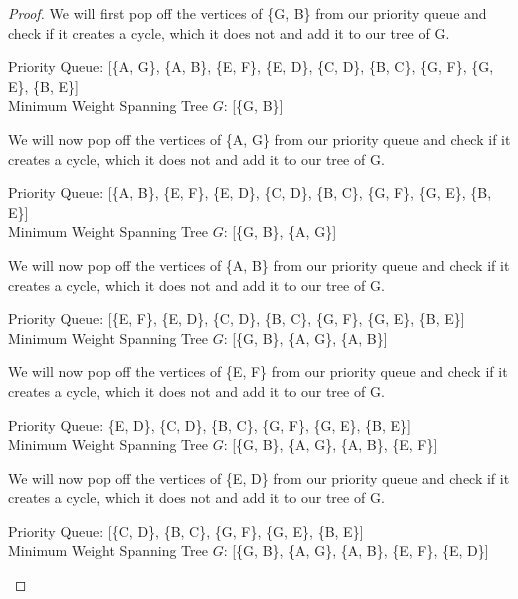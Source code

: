 \documentclass[11pt]{article}
\theoremstyle{definition}
\theoremstyle{definition}
\theoremstyle{definition}
\begin{document}
\begin{proof}
We will first pop off the vertices of \{G, B\} from our priority queue and check if it creates a cycle, which it does not and add it to our tree of G. \\
\begin{center}
Priority Queue: [\{A, G\}, \{A, B\}, \{E, F\}, \{E, D\}, \{C, D\}, \{B, C\}, \{G, F\}, \{G, E\}, \{B, E\}]\\
Minimum Weight Spanning Tree $G$: [\{G, B\}]
\end{center}

We will now pop off the vertices of \{A, G\} from our priority queue and check if it creates a cycle, which it does not and add it to our tree of G. \\
\begin{center}
Priority Queue: [\{A, B\}, \{E, F\}, \{E, D\}, \{C, D\}, \{B, C\}, \{G, F\}, \{G, E\}, \{B, E\}]\\
Minimum Weight Spanning Tree $G$: [\{G, B\}, \{A, G\}]
\end{center}

We will now pop off the vertices of \{A, B\} from our priority queue and check if it creates a cycle, which it does not and add it to our tree of G. \\
\begin{center}
Priority Queue: [\{E, F\}, \{E, D\}, \{C, D\}, \{B, C\}, \{G, F\}, \{G, E\}, \{B, E\}]\\
Minimum Weight Spanning Tree $G$: [\{G, B\}, \{A, G\}, \{A, B\}]
\end{center}

We will now pop off the vertices of \{E, F\} from our priority queue and check if it creates a cycle, which it does not and add it to our tree of G. \\
\begin{center}
Priority Queue: \{E, D\}, \{C, D\}, \{B, C\}, \{G, F\}, \{G, E\}, \{B, E\}] \\
Minimum Weight Spanning Tree $G$: [\{G, B\}, \{A, G\}, \{A, B\}, \{E, F\}]
\end{center}

We will now pop off the vertices of \{E, D\} from our priority queue and check if it creates a cycle, which it does not and add it to our tree of G. \\
\begin{center}
Priority Queue: [\{C, D\}, \{B, C\}, \{G, F\}, \{G, E\}, \{B, E\}]\\
Minimum Weight Spanning Tree $G$: [\{G, B\}, \{A, G\}, \{A, B\}, \{E, F\}, \{E, D\}]
\end{center}


\end{proof}
\end{document}

